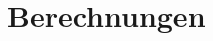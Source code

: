 \documentclass[10pt]{scrartcl}
\begin{document}

    

    

    




    \pagebreak

	\appendix

    \section{Berechnungen}

    
\end{document}
